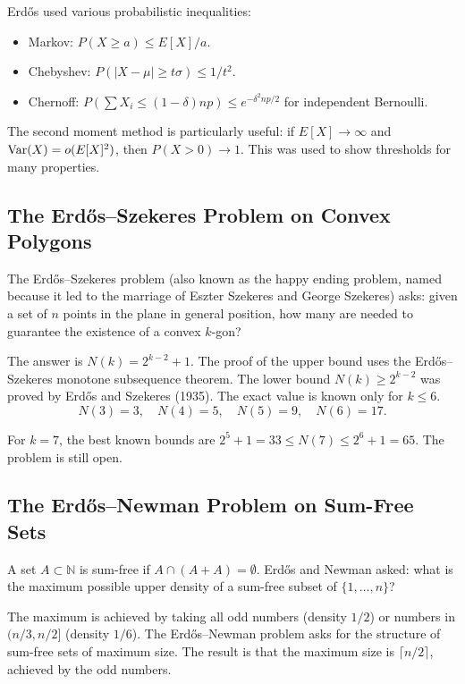 Erd\H{o}s used various probabilistic inequalities:
\begin{itemize}
    \item Markov: $P(X \geq a) \leq E[X]/a$.
    \item Chebyshev: $P(|X - \mu| \geq t\sigma) \leq 1/t^2$.
    \item Chernoff: $P(\sum X_i \leq (1-\delta)np) \leq e^{-\delta^2 np/2}$ for independent Bernoulli.
\end{itemize}

The second moment method is particularly useful: if $E[X] \to \infty$ and $\operatorname{Var}(X) = o(E[X]^2)$, then $P(X > 0) \to 1$. This was used to show thresholds for many properties.

\subsection{The Erd\H{o}s--Szekeres Problem on Convex Polygons}

The Erd\H{o}s--Szekeres problem (also known as the happy ending problem, named because it led to the marriage of Eszter Szekeres and George Szekeres) asks: given a set of $n$ points in the plane in general position, how many are needed to guarantee the existence of a convex $k$-gon?

The answer is $N(k) = 2^{k-2} + 1$. The proof of the upper bound uses the Erd\H{o}s--Szekeres monotone subsequence theorem. The lower bound $N(k) \geq 2^{k-2}$ was proved by Erd\H{o}s and Szekeres (1935). The exact value is known only for $k \leq 6$.
\[
N(3) = 3, \quad N(4) = 5, \quad N(5) = 9, \quad N(6) = 17.
\]

For $k = 7$, the best known bounds are $2^{5}+1 = 33 \leq N(7) \leq 2^{6}+1 = 65$. The problem is still open.

\subsection{The Erd\H{o}s--Newman Problem on Sum-Free Sets}

A set $A \subset \mathbb{N}$ is sum-free if $A \cap (A + A) = \emptyset$. Erd\H{o}s and Newman asked: what is the maximum possible upper density of a sum-free subset of $\{1, \ldots, n\}$?

The maximum is achieved by taking all odd numbers (density $1/2$) or numbers in $(n/3, n/2]$ (density $1/6$). The Erd\H{o}s--Newman problem asks for the structure of sum-free sets of maximum size. The result is that the maximum size is $\lceil n/2\rceil$, achieved by the odd numbers.

